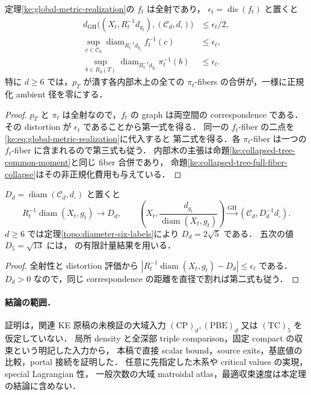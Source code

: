 \begin{corollary}
\label{ke:global-gh-and-fibers}
定理\ref{ke:global-metric-realization}の $f_t$ は全射であり，
$\epsilon_t=\operatorname{dis}(f_t)$ と置くと
\begin{align*}
 d_{\mathrm{GH}}\bigl((X_t,R_t^{-1}d_{g_t}),
                     (\mathcal C_d,d_\square)\bigr)&\le\epsilon_t/2,\\
 \sup_{c\in\mathcal C_d}
 \operatorname{diam}_{R_t^{-1}d_{g_t}}f_t^{-1}(c)&\le\epsilon_t,\\
 \sup_{b\in B_d(T)}
 \operatorname{diam}_{R_t^{-1}d_{g_t}}\pi_t^{-1}(b)&\le\epsilon_t.
\end{align*}
特に $d\ge6$ では，$p_T$ が潰す各内部木上の全ての
$\pi_t$-fibers の合併が，一様に正規化 ambient 径を零にする．
\end{corollary}

\begin{proof}
$p_T$ と $\pi_t$ は全射なので，$f_t$ の graph は両空間の correspondence である．
その distortion が $\epsilon_t$ であることから第一式を得る．
同一の $f_t$-fiber の二点を\eqref{ke:eq:global-metric-realization}に代入すると
第二式を得る．各 $\pi_t$-fiber は一つの $f_t$-fiber に含まれるので第三式も従う．
内部木の主張は命題\ref{ke:collapsed-tree-common-moment}と同じ fiber 合併であり，
命題\ref{ke:collapsed-tree-full-fiber-collapse}はその非正規化費用も与えている．
\end{proof}

\begin{corollary}[直径と径一の規格化]
\label{ke:global-diameter-limit}
$D_d=\operatorname{diam}(\mathcal C_d,d_\square)$ と置くと
\[
 R_t^{-1}\operatorname{diam}(X_t,g_t)\longrightarrow D_d,
 \qquad
 \left(X_t,\frac{d_{g_t}}{\operatorname{diam}(X_t,g_t)}\right)
 \xrightarrow{\mathrm{GH}}(\mathcal C_d,D_d^{-1}d_\square).
\]
$d\ge6$ では定理\ref{topo:diameter-six-labels}により $D_d=2\sqrt5$ である．
五次の値 $D_5=\sqrt{13}$ には，
\cite[\texttt{thm:intro-diameter-C5}]{KECubicalCurrent}の有限計量結果を用いる．
\end{corollary}

\begin{proof}
全射性と distortion 評価から
$|R_t^{-1}\operatorname{diam}(X_t,g_t)-D_d|\le\epsilon_t$ である．
$D_d>0$ なので，同じ correspondence の距離を直径で割れば第二式も従う．
\end{proof}

\paragraph{結論の範囲．}
証明は，関連 KE 原稿の未検証の大域入力
$\mathrm{(CP)}_d,\mathrm{(PBE)}_d$ 又は $\mathrm{(TC)}_5$ を仮定していない．
局所 density と全深部 triple comparison，固定 compact の収束という明記した入力から，
本稿で直接 scalar bound，source exits，基底値の比較，portal 接続を証明した．
任意に先指定した木系や critical values の実現，special Lagrangian 性，
一般次数の大域 matroidal atlas，最適収束速度は本定理の結論に含めない．
